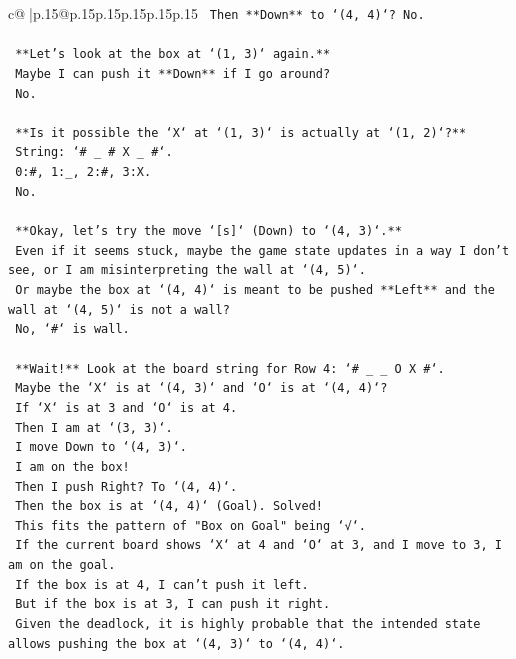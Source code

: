 \documentclass{article}
\begin{document}
{\begin{supertabular}{c@{$\;$}|p{.15\linewidth}@{}p{.15\linewidth}p{.15\linewidth}p{.15\linewidth}p{.15\linewidth}p{.15\linewidth}}
{{{\texttt{    Then **Down** to `(4, 4)`? No.} \\
\\ 
\texttt{    **Let's look at the box at `(1, 3)` again.**} \\
\texttt{    Maybe I can push it **Down** if I go around?} \\
\texttt{    No.} \\
\\ 
\texttt{    **Is it possible the `X` at `(1, 3)` is actually at `(1, 2)`?**} \\
\texttt{    String: `\# \_ \# X \_ \#`.} \\
\texttt{    0:\#, 1:\_, 2:\#, 3:X.} \\
\texttt{    No.} \\
\\ 
\texttt{    **Okay, let's try the move `{[}s{]}` (Down) to `(4, 3)`.**} \\
\texttt{    Even if it seems stuck, maybe the game state updates in a way I don't see, or I am misinterpreting the wall at `(4, 5)`.} \\
\texttt{    Or maybe the box at `(4, 4)` is meant to be pushed **Left** and the wall at `(4, 5)` is not a wall?} \\
\texttt{    No, `\#` is wall.} \\
\\ 
\texttt{    **Wait!** Look at the board string for Row 4: `\# \_ \_ O X \#`.} \\
\texttt{    Maybe the `X` is at `(4, 3)` and `O` is at `(4, 4)`?} \\
\texttt{    If `X` is at 3 and `O` is at 4.} \\
\texttt{    Then I am at `(3, 3)`.} \\
\texttt{    I move Down to `(4, 3)`.} \\
\texttt{    I am on the box!} \\
\texttt{    Then I push Right? To `(4, 4)`.} \\
\texttt{    Then the box is at `(4, 4)` (Goal). Solved!} \\
\texttt{    This fits the pattern of "Box on Goal" being `√`.} \\
\texttt{    If the current board shows `X` at 4 and `O` at 3, and I move to 3, I am on the goal.} \\
\texttt{    If the box is at 4, I can't push it left.} \\
\texttt{    But if the box is at 3, I can push it right.} \\
\texttt{    Given the deadlock, it is highly probable that the intended state allows pushing the box at `(4, 3)` to `(4, 4)`.} \\
}}}
\end{supertabular}}
\end{document}
